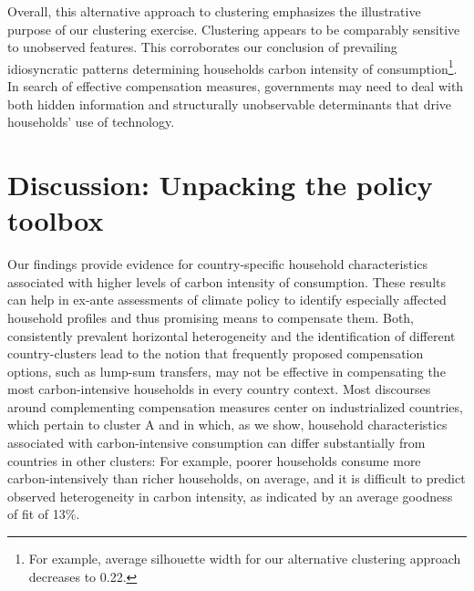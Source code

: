 \documentclass[12pt, a4paper]{article}
\begin{document}
Overall, this alternative approach to clustering emphasizes the illustrative purpose of our clustering exercise. Clustering appears to be comparably sensitive to unobserved features. This corroborates our conclusion of prevailing idiosyncratic patterns determining households carbon intensity of consumption\footnote{For example, average silhouette width for our alternative clustering approach decreases to 0.22.}. In search of effective compensation measures, governments may need to deal with both hidden information and structurally unobservable determinants that drive households' use of technology.

\section{Discussion: Unpacking the policy toolbox} \label{sec:discussion}

Our findings provide evidence for country-specific household characteristics associated with higher levels of carbon intensity of consumption. These results can help in ex-ante assessments of climate policy to identify especially affected household profiles and thus promising means to compensate them. Both, consistently prevalent horizontal heterogeneity and the identification of different country-clusters lead to the notion that frequently proposed compensation options, such as lump-sum transfers, may not be effective in compensating the most carbon-intensive households in every country context. Most discourses around complementing compensation measures center on industrialized countries, which pertain to cluster A and in which, as we show, household characteristics associated with carbon-intensive consumption can differ substantially from countries in other clusters: For example, poorer households consume more carbon-intensively than richer households, on average, and it is difficult to predict observed heterogeneity in carbon intensity, as indicated by an average goodness of fit of 13\%.
\end{document}
